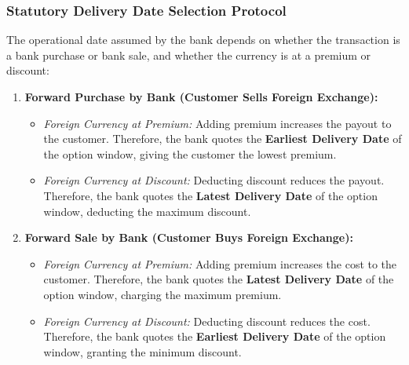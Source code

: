 \subsubsection{Statutory Delivery Date Selection Protocol}
The operational date assumed by the bank depends on whether the transaction is a bank purchase or bank sale, and whether the currency is at a premium or discount:
\begin{enumerate}[leftmargin=*]
    \item \textbf{Forward Purchase by Bank (Customer Sells Foreign Exchange):}
    \begin{itemize}[noitemsep]
        \item \textit{Foreign Currency at Premium:} Adding premium increases the payout to the customer. Therefore, the bank quotes the \textbf{Earliest Delivery Date} of the option window, giving the customer the lowest premium.
        \item \textit{Foreign Currency at Discount:} Deducting discount reduces the payout. Therefore, the bank quotes the \textbf{Latest Delivery Date} of the option window, deducting the maximum discount.
    \end{itemize}
    \item \textbf{Forward Sale by Bank (Customer Buys Foreign Exchange):}
    \begin{itemize}[noitemsep]
        \item \textit{Foreign Currency at Premium:} Adding premium increases the cost to the customer. Therefore, the bank quotes the \textbf{Latest Delivery Date} of the option window, charging the maximum premium.
        \item \textit{Foreign Currency at Discount:} Deducting discount reduces the cost. Therefore, the bank quotes the \textbf{Earliest Delivery Date} of the option window, granting the minimum discount.
    \end{itemize}
\end{enumerate}

